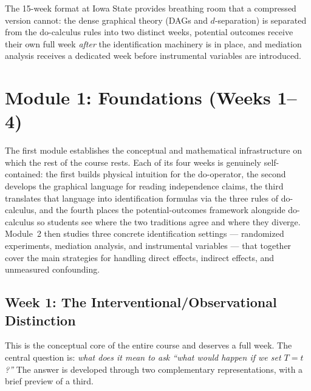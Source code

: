 \documentclass[12pt]{article}
\begin{document}
The 15-week format at Iowa State provides breathing room that a compressed
version cannot: the dense graphical theory (DAGs and $d$-separation) is
separated from the do-calculus rules into two distinct weeks, potential
outcomes receive their own full week \emph{after} the identification machinery
is in place, and mediation analysis receives a dedicated week before
instrumental variables are introduced.

\section{Module 1: Foundations (Weeks 1--4)}

The first module establishes the conceptual and mathematical infrastructure
on which the rest of the course rests. Each of its four weeks is genuinely
self-contained: the first builds physical intuition for the do-operator, the
second develops the graphical language for reading independence claims, the
third translates that language into identification formulas via the three
rules of do-calculus, and the fourth places the potential-outcomes framework
alongside do-calculus so students see where the two traditions agree and
where they diverge.
Module~2 then studies three concrete identification settings ---
randomized experiments, mediation analysis, and instrumental variables ---
that together cover the main strategies for handling direct effects, indirect
effects, and unmeasured confounding.

\subsection{Week 1: The Interventional/Observational Distinction}

This is the conceptual core of the entire course and deserves a full week.
The central question is: \emph{what does it mean to ask ``what would happen
if we set $T = t$?''} The answer is developed through two complementary
representations, with a brief preview of a third.
\end{document}
